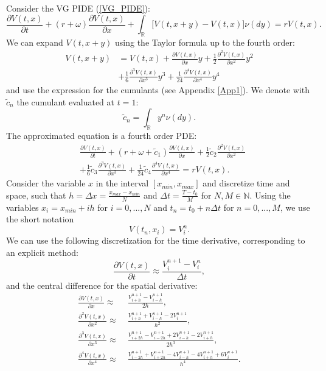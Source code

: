 \documentclass[]{interact}
\newcommand{\numberset}{\mathbb}
\newcommand{\N}{\numberset{N}}
\newcommand{\R}{\numberset{R}}
\theoremstyle{plain}%
\theoremstyle{definition}
\theoremstyle{remark}
\begin{document}
Consider the VG PIDE (\ref{VG_PIDE}):
\begin{equation}
 \frac{\partial V(t,x)}{\partial t} + (r+\omega) \frac{\partial V(t,x)}{\partial x}
 + \int_{\R} \bigl[ V(t,x+y) - V(t,x) \bigr] \nu(dy) = rV(t,x). 
\end{equation}
We can expand $V(t,x+y)$ using the Taylor formula up to the fourth order:
\begin{align}
 V(t,x+y) &= V(t,x) + \frac{\partial V(t,x)}{\partial x} y + \frac{1}{2} \frac{\partial^2 V(t,x)}{\partial x^2} y^2 \\ \nonumber
  &+ \frac{1}{6} \frac{\partial^3 V(t,x)}{\partial x^3} y^3 + \frac{1}{24} \frac{\partial^4 V(t,x)}{\partial x^4} y^4 
\end{align}
and use the expression for the cumulants (see Appendix \ref{App1}). We denote with $\tilde c_n$ the cumulant evaluated at $t=1:$
\begin{equation}
 \tilde c_n = \int_{\R} y^n \nu(dy). 
\end{equation}
The approximated equation is a fourth order PDE:
\begin{align}
 & \frac{\partial V(t,x)}{\partial t} + (r+\omega+\tilde c_1) \frac{\partial V(t,x)}{\partial x}
 + \frac{1}{2} \tilde c_2 \frac{\partial^2 V(t,x)}{\partial x^2} \\ \nonumber
 &+ \frac{1}{6} \tilde c_3 \frac{\partial^3 V(t,x)}{\partial x^3} + \frac{1}{24} \tilde c_4 \frac{\partial^4 V(t,x)}{\partial x^4} 
 = rV(t,x). 
\end{align}
Consider the variable $x$ in the interval $[x_{min},x_{max}]$ and   
discretize time and space, such that $h = \Delta x = \frac{x_{max} - x_{min}}{N} $ and $\Delta t = \frac{T-t_0}{M}$ 
for $N,M \in \N$.
Using the variables $x_i = x_{min} + ih$ for $i=0,...,N$ and $t_n= t_0 + n\Delta t$ for $n=0,...,M$, we use the short notation
$$V(t_n,x_i) = V^n_i.$$
We can use the following discretization for the time derivative, corresponding to an explicit method:
\begin{equation}
 \frac{\partial V(t,x)}{\partial t} \approx \frac{V^{n+1}_i - V^n_i}{\Delta t}, 
\end{equation}
and the central difference for the spatial derivative:
\begin{align}
 \frac{\partial V(t,x)}{\partial x} \approx& \; \frac{V^{n+1}_{i + h} - V^{n+1}_{i-h}}{2h}, \\ \nonumber 
 \frac{\partial^2 V(t,x)}{\partial x^2} \approx& \; \frac{V^{n+1}_{i + h} + V^{n+1}_{i - h} - 2V^{n+1}_{i}}{h^2}, \\ \nonumber 
 \frac{\partial^3 V(t,x)}{\partial x^3} \approx& \; \frac{ V^{n+1}_{i + 2h} - V^{n+1}_{i - 2h} 
 +2V^{n+1}_{i - h} - 2V^{n+1}_{i + h} }{2h^3}, \\ \nonumber
 \frac{\partial^4 V(t,x)}{\partial x^4} \approx& \; \frac{ V^{n+1}_{i - 2h} + V^{n+1}_{i + 2h} -4V^{n+1}_{i - h} - 
 4V^{n+1}_{i + h} + 6V^{n+1}_{i}}{h^4}. \\ \nonumber
\end{align}
\end{document}
